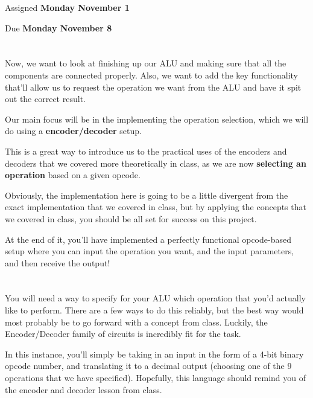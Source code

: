 \documentclass{article}
\begin{document}
\large

{\selectfont{\Huge CMSC389E Project 3: \par Finishing the ALU}}

Assigned \textbf{Monday November 1}

Due \textbf{Monday November 8}

\section{\selectfont{Looking More like a Computer Every Day}}

Now, we want to look at finishing up our ALU and making sure that all the components are connected properly. 
Also, we want to add the key functionality that'll allow us to request the operation we want from the ALU and have it spit out the correct result.

Our main focus will be in the implementing the operation selection, which we will do using a \textbf{encoder/decoder} setup.

This is a great way to introduce us to the practical uses of the encoders and decoders that we covered more theoretically in class, as we are now \textbf{selecting an operation} based on a given opcode.

Obviously, the implementation here is going to be a little divergent from the exact implementation that we covered in class, but by applying the concepts that we covered in class, you should be all set for success on this project.

At the end of it, you'll have implemented a perfectly functional opcode-based setup where you can input the operation you want, and the input parameters, and then receive the output! 

\section{\selectfont{Conceptual Overview: Encoding/Decoding}}

You will need a way to specify for your ALU which operation that you'd actually like to perform. There are a few ways to do this reliably, but the best way would most probably be to go forward with a concept from class. 
Luckily, the Encoder/Decoder family of circuits is incredibly fit for the task.

In this instance, you'll simply be taking in an input in the form of a 4-bit binary opcode number, and translating it to a decimal output (choosing one of the 9 operations that we have specified).
Hopefully, this language should remind you of the encoder and decoder lesson from class.
\end{document}
